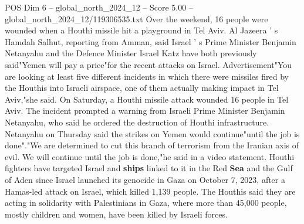 \begin{textsample}{POS Dim 6 – global\_north\_2024\_12 – Score 5.00 – global\_north\_2024\_12/119306535.txt}
Over the weekend, 16 people were wounded when a Houthi missile hit a playground in Tel Aviv.
Al Jazeera ' s Hamdah Salhut, reporting from Amman, said Israel ' s Prime Minister Benjamin Netanyahu and the Defence Minister Israel Katz have both previously said"Yemen will pay a price"for the recent attacks on Israel.
Advertisement"You are looking at least five different incidents in which there were missiles fired by the Houthis into Israeli airspace, one of them actually making impact in Tel Aviv,"she said.
On Saturday, a Houthi missile attack wounded 16 people in Tel Aviv.
The incident prompted a warning from Israeli Prime Minister Benjamin Netanyahu, who said he ordered the destruction of Houthi infrastructure.
Netanyahu on Thursday said the strikes on Yemen would continue"until the job is done"."We are determined to cut this branch of terrorism from the Iranian axis of evil.
We will continue until the job is done,"he said in a video statement.
Houthi fighters have targeted Israel and \textbf{ships} linked to it in the Red \textbf{Sea} and the Gulf of Aden since Israel launched its genocide in Gaza on October 7, 2023, after a Hamas-led attack on Israel, which killed 1,139 people.
The Houthis said they are acting in solidarity with Palestinians in Gaza, where more than 45,000 people, mostly children and women, have been killed by Israeli forces.

\end{textsample}
